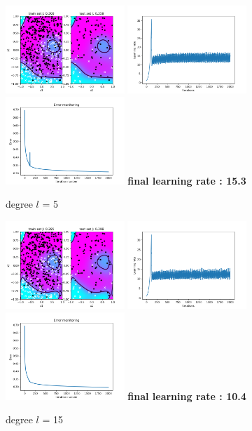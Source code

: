 \documentclass[a4paper]{article}
\begin{document}
\begin{figure}[h]	
	\includegraphics[width=0.4\textwidth]{logreg_deg5_iter2000.png}
	\includegraphics[width=0.4\textwidth]{logreg_deg5_iter2000_learn.png}
	\includegraphics[width=0.4\textwidth]{logreg_deg5_iter2000_error.png}
	\textbf{final learning rate : 15.3}
	\caption{degree $l$ = 5}
\end{figure}
\begin{figure}[h]	
	\includegraphics[width=0.4\textwidth]{logreg_deg15_iter2000.png}
	\includegraphics[width=0.4\textwidth]{logreg_deg15_iter2000_learn.png}
	\includegraphics[width=0.4\textwidth]{logreg_deg15_iter2000_error.png}
	\textbf{final learning rate : 10.4}
	\caption{degree $l$ = 15}
\end{figure}
\clearpage
\end{document}

